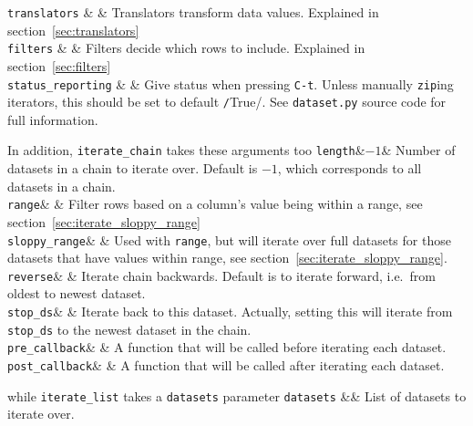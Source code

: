   \RP \texttt{translators} & \pyNone & Translators transform data values.
  Explained in section~\ref{sec:translators}\\[1ex]
  
  \RP \texttt{filters} & \pyNone & Filters decide which rows to include.
  Explained in section~\ref{sec:filters}\\[1ex]

  \RP \texttt{status\_reporting} & \pyTrue & Give status when pressing
  \texttt{C-t}.  Unless manually \texttt{zip}ing iterators, this
  should be set to default \texttt/True/.  See
  \texttt{dataset.py} source code for full information.\\
\stoptable

\noindent In addition, \texttt{iterate\_chain} takes these arguments too
\starttable
  \RP \texttt{length}&$-1$& Number of datasets in a chain to iterate over.
  Default is $-1$, which corresponds to all datasets in a chain.\\[1ex]
  
  \RP \texttt{range}& \pyNone& Filter rows based on a column's value being
  within a range, see section~\ref{sec:iterate_sloppy_range}\\[1ex]

  \RP \texttt{sloppy\_range}& \pyFalse & Used with \texttt{range}, but will
  iterate over full datasets for those datasets that have values
  within range, see section~\ref{sec:iterate_sloppy_range}.\\[1ex]
  
  \RP \texttt{reverse}& \pyFalse & Iterate chain
  backwards.  Default is to iterate forward, i.e.\ from oldest to
  newest dataset.\\[1ex]

  \RP \texttt{stop\_ds}& \pyNone & Iterate back to this dataset.  Actually, setting
  this will iterate from \texttt{stop\_ds} to the newest dataset in the chain.\\[1ex]

  \RP \texttt{pre\_callback}& \pyNone & A function that will be called before
  iterating each dataset.\\[1ex]

  \RP \texttt{post\_callback}& \pyNone & A function that will be called after
  iterating each dataset.\\
\stoptable

\noindent while \texttt{iterate\_list} takes a \texttt{datasets} parameter
\starttable
  \RP \texttt{datasets} &\pyNone& List of datasets to iterate over.
\stoptable



